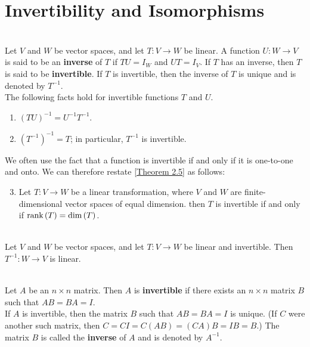 \section{Invertibility and Isomorphisms}

\begin{definition}
	\hfill\\
	Let $V$ and $W$ be vector spaces, and let $T: V \to W$ be linear. A function $U: W \to V$ is said to be an \textbf{inverse} of $T$ if $TU = I_W$ and $UT = I_V$. If $T$ has an inverse, then $T$ is said to be \textbf{invertible}. If $T$ is invertible, then the inverse of $T$ is unique and is denoted by $T^{-1}$.\\
	
	The following facts hold for invertible functions $T$ and $U$.
	
	\begin{enumerate}
		\item $(TU)^{-1} = U^{-1}T^{-1}$.
		\item $(T^{-1})^{-1} = T$; in particular, $T^{-1}$ is invertible.
	\end{enumerate}
	
	We often use the fact that a function is invertible if and only if it is one-to-one and onto. We can therefore restate \autoref{Theorem 2.5} as follows:
	
	\begin{enumerate}
		\setcounter{enumi}{2}
		\item Let $T: V \to W$ be a linear transformation, where $V$ and $W$ are finite-dimensional vector spaces of equal dimension. then $T$ is invertible if and only if $\text{rank}\left(T\right) = \text{dim}\left(T\right)$.
	\end{enumerate}
\end{definition}

\begin{theorem}
	\hfill\\
	Let $V$ and $W$ be vector spaces, and let $T: V \to W$ be linear and invertible. Then $T^{-1}: W \to V$ is linear.
\end{theorem}

\begin{definition}
	\hfill\\
	Let $A$ be an $n \times n$ matrix. Then $A$ is \textbf{invertible} if there exists an $n \times n$ matrix $B$ such that $AB = BA = I$.\\
	
	If $A$ is invertible, then the matrix $B$ such that $AB = BA = I$ is unique. (If $C$ were another such matrix, then $C = CI = C(AB) = (CA)B = IB = B$.) The matrix $B$ is called the \textbf{inverse} of $A$ and is denoted by $A^{-1}$.
\end{definition}

